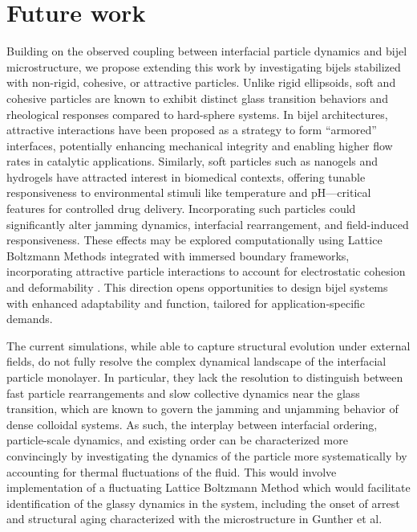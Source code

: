 \section{Future work}

Building on the observed coupling between interfacial particle dynamics and bijel microstructure, we propose extending 
this work by investigating bijels stabilized with non-rigid, cohesive, or attractive particles. Unlike rigid ellipsoids, 
soft and cohesive particles are known to exhibit distinct glass transition behaviors and rheological responses compared 
to hard-sphere systems. \cite{weeks_introduction_2017, torquato_jammed_2010} In bijel architectures, attractive interactions have been 
proposed as a strategy to form “armored” interfaces, potentially enhancing mechanical integrity and enabling higher flow rates in catalytic applications. 
\cite{boakye-ansah_controlling_2020}
Similarly, soft particles such as nanogels and hydrogels have attracted interest in biomedical contexts, offering tunable responsiveness 
to environmental stimuli like temperature and pH—critical features for controlled drug delivery. Incorporating such particles 
could significantly alter jamming dynamics, interfacial rearrangement, and field-induced responsiveness. These effects may be 
explored computationally using Lattice Boltzmann Methods integrated with immersed boundary frameworks, incorporating attractive
particle  interactions to account for electrostatic cohesion and deformability \cite{silva_lattice_2024}. This direction opens opportunities 
to design bijel systems with enhanced adaptability and function, tailored for application-specific demands.

The current simulations, while able to capture structural evolution under external fields, do not fully resolve the complex dynamical landscape of the interfacial 
particle monolayer. In particular, they lack the resolution to distinguish between fast particle rearrangements and slow collective dynamics near the glass transition, 
which are known to govern the jamming and unjamming behavior of dense colloidal systems. \cite{weeks_introduction_2017, torquato_jammed_2010} 
As such, the interplay between interfacial ordering, particle-scale dynamics, and existing order can be characterized more convincingly by investigating the dynamics of
the particle more systematically by accounting for thermal fluctuations of the fluid. This would involve implementation of a fluctuating Lattice Boltzmann Method
which would facilitate identification of the glassy dynamics in the system, including the onset of arrest and structural aging characterized with the microstructure
in Gunther et al. \cite{gunther_timescales_2014}

